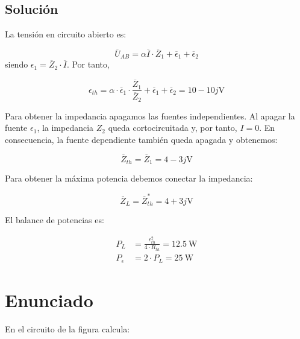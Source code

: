 \subsection*{Solución}

La tensión en circuito abierto es:

\begin{equation*}
  \overline{U}_{AB} = \alpha \overline{I} \cdot \overline{Z}_1 + \overline{\epsilon}_1 + \overline{\epsilon}_2
\end{equation*}
siendo $\epsilon_1 = \overline{Z}_2 \cdot \overline{I}$. Por tanto,

\begin{equation*}
  \epsilon_{th} = \alpha \cdot \overline{\epsilon}_1 \cdot \frac{\overline{Z}_1}{\overline{Z}_2} + \overline{\epsilon}_1 + \overline{\epsilon}_2 = 10 - 10j \si{\volt}
\end{equation*}

Para obtener la impedancia apagamos las fuentes independientes. Al apagar la fuente $\epsilon_1$, la impedancia $Z_2$ queda cortocircuitada y, por tanto, $I = 0$. En consecuencia, la fuente dependiente también queda apagada y obtenemos:

\begin{equation*}
  \overline{Z}_{th} = \overline{Z}_1 = 4 - 3j \si{\volt}
\end{equation*}

Para obtener la máxima potencia debemos conectar la impedancia:

\begin{equation*}
  \overline{Z}_{L} = \overline{Z}^*_{th} = 4 + 3j \si{\volt}
\end{equation*}

El balance de potencias es:

\begin{align*}
  P_L &= \frac{\epsilon_{th}^2}{4 \cdot R_{th}} = \SI{12.5}{\watt}\\
  P_{\epsilon} &= 2 \cdot P_L = \SI{25}{\watt} 
\end{align*}
\section{Enunciado}

En el circuito de la figura calcula:

